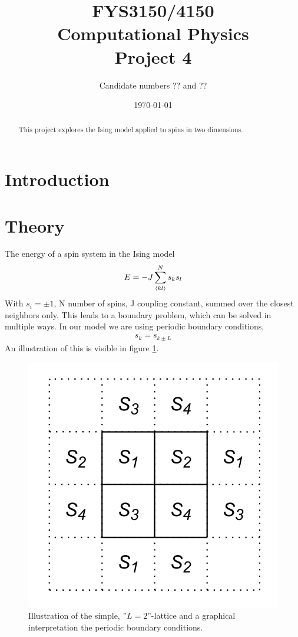 \documentclass[11pt,a4paper,english]{article}
\title{FYS3150/4150\\Computational Physics\\Project 4}
\author{Candidate numbers ?? and ??}
\date{\today}
\numberwithin{equation}{section}
\begin{document}
\maketitle

\begin{abstract}
This project explores the Ising model applied to spins in two dimensions.
\end{abstract}



\section{Introduction}


\section{Theory}

The energy of a spin system in the Ising model 
\begin{gather}
E = -J\sum_{\expval{kl}}^N s_k s_l
\end{gather}
With $s_i = \pm 1$, N number of spins, J coupling constant, summed over 
the closest neighbors only. This leads to a boundary problem, which 
can be solved in multiple ways. In our model we are 
using periodic boundary conditions,
\begin{gather}
s_k = s_{k \pm L}
\label{eq:boundary}
\end{gather}
An illustration of this is visible in figure \ref{fig:spin_neighbours}.

\begin{figure}[H]
\centering
\includegraphics[scale=0.15]{pics/simple_lattice.png}
\caption{ Illustration of the simple, ''$L=2$''-lattice and a graphical interpretation the periodic boundary conditions.}
\label{fig:spin_neighbours}
\end{figure}
\end{document}
